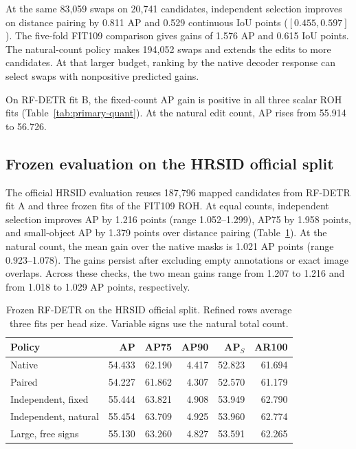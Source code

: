 \documentclass[journal]{IEEEtran}
\begin{document}
At the same 83,059 swaps on 20,741 candidates, independent selection improves on distance pairing by 0.811 AP and 0.529 continuous IoU points (\([0.455,0.597]\)). The five-fold FIT109 comparison gives gains of 1.576 AP and 0.615 IoU points. The natural-count policy makes 194,052 swaps and extends the edits to more candidates. At that larger budget, ranking by the native decoder response can select swaps with nonpositive predicted gains.

On RF-DETR fit B, the fixed-count AP gain is positive in all three scalar ROH fits (Table~\ref{tab:primary-quant}). At the natural edit count, AP rises from 55.914 to 56.726.

\subsection{Frozen evaluation on the HRSID official split}
The official HRSID evaluation reuses 187,796 mapped candidates from RF-DETR fit A and three frozen fits of the FIT109 ROH. At equal counts, independent selection improves AP by 1.216 points (range 1.052--1.299), AP75 by 1.958 points, and small-object AP by 1.379 points over distance pairing (Table~\ref{tab:official}). At the natural count, the mean gain over the native masks is 1.021 AP points (range 0.923--1.078). The gains persist after excluding empty annotations or exact image overlaps. Across these checks, the two mean gains range from 1.207 to 1.216 and from 1.018 to 1.029 AP points, respectively.

\begin{table}[t]
\centering
\caption{Frozen RF-DETR on the HRSID official split. Refined rows average three fits per head size. Variable signs use the natural total count.}
\label{tab:official}
\footnotesize
\setlength{\tabcolsep}{3.5pt}
\begin{tabular}{@{}lrrrrr@{}}
\toprule
Policy & AP & AP75 & AP90 & AP$_{S}$ & AR100\\
\midrule
Native & 54.433 & 62.190 & 4.417 & 52.823 & 61.694\\
Paired & 54.227 & 61.862 & 4.307 & 52.570 & 61.179\\
Independent, fixed & 55.444 & 63.821 & 4.908 & 53.949 & 62.790\\
Independent, natural & 55.454 & 63.709 & 4.925 & 53.960 & 62.774\\
Large, free signs & 55.130 & 63.260 & 4.827 & 53.591 & 62.265\\
\bottomrule
\end{tabular}
\end{table}
\end{document}

